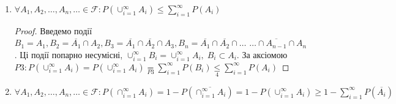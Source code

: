 \begin{enumerate}
    \item $\forall A_1, A_2, \dots, A_n, \dots \in \mathcal{F}: 
    P(\cup_{i=1}^\infty A_i) \leq \sum_{i=1}^\infty P(A_i)$
    \begin{proof}
        Введемо події $B_1 = A_1, B_2 = \overline{A_1} \cap A_2, 
        B_3 = \overline{A_1} \cap \overline{A_2} \cap A_3, B_n = 
        \overline{A_1} \cap \overline{A_2} \cap \dots$ 
        \newline
        $\dots \cap \overline{A_{n-1}} \cap A_n$. Ці події попарно несумісні, 
        $\cup_{i=1}^\infty B_i = \cup_{i=1}^\infty A_i,\;B_i \subset A_i.$
        \newline
        За аксіомою $P3: P(\cup_{i=1}^\infty A_i) = P(\cup_{i=1}^\infty A_i) 
        \underset{P3}{=} \sum_{i=1}^\infty P(B_i) \underset{4}{\leq} 
        \sum_{i=1}^\infty P(A_i)$
    \end{proof}
    \item $\forall A_1, A_2, \dots, A_n, \dots \in \mathcal{F}: P(\cap_{i=1}^\infty
    A_i) = 1 - P(\overline{\cap_{i=1}^\infty A_i}) = 1 - P(\cup_{i=1}^\infty A_i) \geq  
    1 - \sum_{i=1}^\infty P(\overline{A_i})$
\end{enumerate}